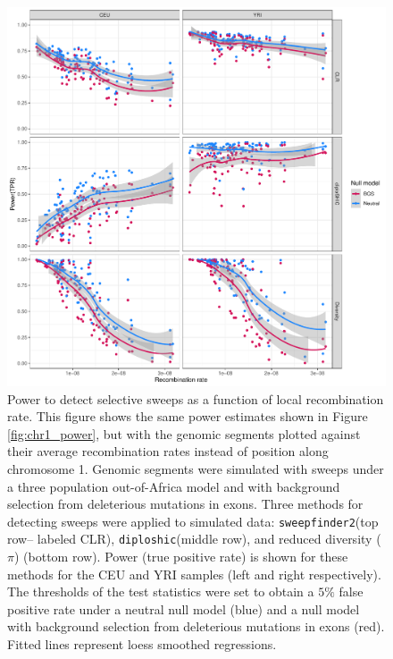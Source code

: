 \documentclass[hidelinks]{article}
\newcommand{\sweepfinder}{\texttt{sweepfinder2}\xspace}
\newcommand{\diploshic}{\texttt{diploshic}\xspace}
\begin{document}
    \begin{figure}[b!]
        \centering
        \includegraphics[width=0.8 \textwidth]{figures/sweeps/relationship_power_cM.pdf}
        \caption{
        Power to detect selective sweeps
        as a function of local recombination rate.
        This figure shows the same power estimates shown in Figure \ref{fig:chr1_power},
        but with the genomic segments plotted against their
        average recombination rates instead of position along chromosome 1.
    	Genomic segments were simulated with sweeps under a three population out-of-Africa model
        and with background selection from deleterious mutations in exons.
        Three methods for detecting sweeps were applied to simulated data:
        \sweepfinder (top row-- labeled CLR),
        \diploshic (middle row),
        and reduced diversity ($\pi$) (bottom row).
        Power (true positive rate) is shown for these methods for the CEU and YRI
        samples (left and right respectively).
        The thresholds of the test statistics were set to obtain a
        $5\%$ false positive rate under a neutral null model (blue)
        and a null model with background selection from deleterious mutations in exons (red).
        Fitted lines represent loess smoothed regressions.
        }
        \label{fig:power-recomb}
    \end{figure}
\end{document}

